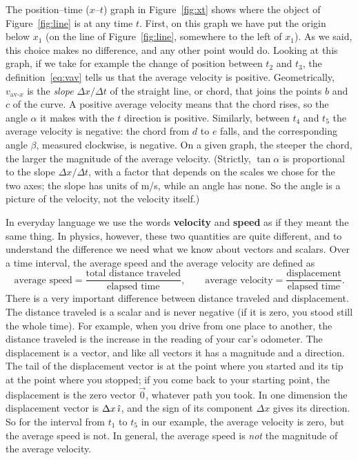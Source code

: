\documentclass[11pt,a4paper]{article}
\newcommand{\vavx}{v_{\mathrm{av}\text{-}x}}   %
\begin{document}
The position--time ($x$--$t$) graph in Figure~\ref{fig:xt} shows where the object of
Figure~\ref{fig:line} is at any time $t$. First, on this graph we have put the origin below $x_1$
(on the line of Figure~\ref{fig:line}, somewhere to the left of $x_1$). As we said, this choice makes no difference,
and any other point would do. Looking at this graph, if we take for example the change of position
between $t_2$ and $t_3$, the definition~\eqref{eq:vav} tells us that the average velocity is
positive. Geometrically, $\vavx$ is the \emph{slope} $\Delta x/\Delta t$ of the straight line, or
chord, that joins the points $b$ and $c$ of the curve. A positive average velocity means that the
chord rises, so the angle $\alpha$ it makes with the $t$ direction is positive. Similarly, between
$t_4$ and $t_5$ the average velocity is negative: the chord from $d$ to $e$ falls, and the
corresponding angle $\beta$, measured clockwise, is negative. On a given graph, the steeper the
chord, the larger the magnitude of the average velocity. (Strictly, $\tan\alpha$ is proportional
to the slope $\Delta x/\Delta t$, with a factor that depends on the scales we chose for the two
axes; the slope has units of \unit{m/s}, while an angle has none. So the angle is a picture of the
velocity, not the velocity itself.)

In everyday language we use the words \textbf{velocity} and \textbf{speed} as if they meant the
same thing. In physics, however, these two quantities are quite different, and to understand the
difference we need what we know about vectors and scalars. Over a time interval, the average speed
and the average velocity are defined as
\[
  \text{average speed} = \frac{\text{total distance traveled}}{\text{elapsed time}} , \qquad
  \text{average velocity} = \frac{\text{displacement}}{\text{elapsed time}} .
\]
There is a very important difference between distance traveled and displacement. The distance
traveled is a scalar and is never negative (if it is zero, you stood still the whole time). For
example, when you drive from one place to another, the distance traveled is the increase in the
reading of your car's odometer. The displacement is a vector, and like all vectors it has a
magnitude and a direction. The tail of the displacement vector is at the point where you started
and its tip at the point where you stopped; if you come back to your starting point, the
displacement is the zero vector $\vec{0}$, whatever path you took. In one dimension the
displacement vector is $\Delta x\,\hat{\imath}$, and the sign of its component $\Delta x$ gives its
direction. So for the interval from $t_1$ to $t_5$ in our example, the average velocity is zero,
but the average speed is not. In general, the average speed is \emph{not} the magnitude of the
average velocity.
\end{document}
